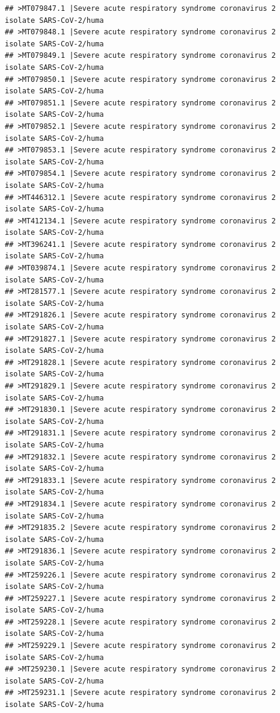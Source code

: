 \documentclass[
]{book}
\begin{document}
\begin{verbatim}
## >MT079847.1 |Severe acute respiratory syndrome coronavirus 2 isolate SARS-CoV-2/huma
## >MT079848.1 |Severe acute respiratory syndrome coronavirus 2 isolate SARS-CoV-2/huma
## >MT079849.1 |Severe acute respiratory syndrome coronavirus 2 isolate SARS-CoV-2/huma
## >MT079850.1 |Severe acute respiratory syndrome coronavirus 2 isolate SARS-CoV-2/huma
## >MT079851.1 |Severe acute respiratory syndrome coronavirus 2 isolate SARS-CoV-2/huma
## >MT079852.1 |Severe acute respiratory syndrome coronavirus 2 isolate SARS-CoV-2/huma
## >MT079853.1 |Severe acute respiratory syndrome coronavirus 2 isolate SARS-CoV-2/huma
## >MT079854.1 |Severe acute respiratory syndrome coronavirus 2 isolate SARS-CoV-2/huma
## >MT446312.1 |Severe acute respiratory syndrome coronavirus 2 isolate SARS-CoV-2/huma
## >MT412134.1 |Severe acute respiratory syndrome coronavirus 2 isolate SARS-CoV-2/huma
## >MT396241.1 |Severe acute respiratory syndrome coronavirus 2 isolate SARS-CoV-2/huma
## >MT039874.1 |Severe acute respiratory syndrome coronavirus 2 isolate SARS-CoV-2/huma
## >MT281577.1 |Severe acute respiratory syndrome coronavirus 2 isolate SARS-CoV-2/huma
## >MT291826.1 |Severe acute respiratory syndrome coronavirus 2 isolate SARS-CoV-2/huma
## >MT291827.1 |Severe acute respiratory syndrome coronavirus 2 isolate SARS-CoV-2/huma
## >MT291828.1 |Severe acute respiratory syndrome coronavirus 2 isolate SARS-CoV-2/huma
## >MT291829.1 |Severe acute respiratory syndrome coronavirus 2 isolate SARS-CoV-2/huma
## >MT291830.1 |Severe acute respiratory syndrome coronavirus 2 isolate SARS-CoV-2/huma
## >MT291831.1 |Severe acute respiratory syndrome coronavirus 2 isolate SARS-CoV-2/huma
## >MT291832.1 |Severe acute respiratory syndrome coronavirus 2 isolate SARS-CoV-2/huma
## >MT291833.1 |Severe acute respiratory syndrome coronavirus 2 isolate SARS-CoV-2/huma
## >MT291834.1 |Severe acute respiratory syndrome coronavirus 2 isolate SARS-CoV-2/huma
## >MT291835.2 |Severe acute respiratory syndrome coronavirus 2 isolate SARS-CoV-2/huma
## >MT291836.1 |Severe acute respiratory syndrome coronavirus 2 isolate SARS-CoV-2/huma
## >MT259226.1 |Severe acute respiratory syndrome coronavirus 2 isolate SARS-CoV-2/huma
## >MT259227.1 |Severe acute respiratory syndrome coronavirus 2 isolate SARS-CoV-2/huma
## >MT259228.1 |Severe acute respiratory syndrome coronavirus 2 isolate SARS-CoV-2/huma
## >MT259229.1 |Severe acute respiratory syndrome coronavirus 2 isolate SARS-CoV-2/huma
## >MT259230.1 |Severe acute respiratory syndrome coronavirus 2 isolate SARS-CoV-2/huma
## >MT259231.1 |Severe acute respiratory syndrome coronavirus 2 isolate SARS-CoV-2/huma

\end{verbatim}
\end{document}
